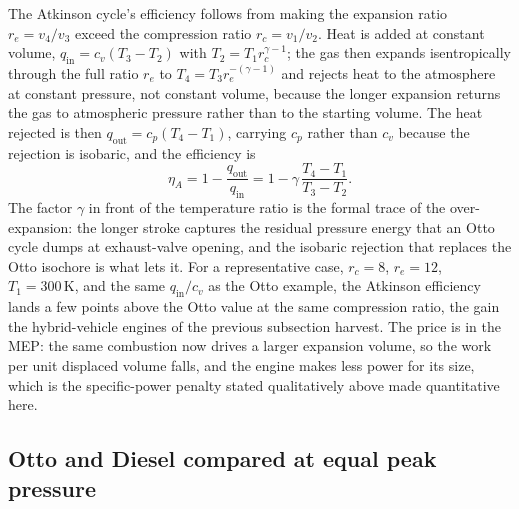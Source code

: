 The Atkinson cycle's efficiency follows from making the expansion ratio
$r_e = v_4/v_3$ exceed the compression ratio $r_c = v_1/v_2$. Heat is added
at constant volume, $q_{\text{in}} = c_v(T_3 - T_2)$ with $T_2 = T_1
r_c^{\gamma-1}$; the gas then expands isentropically through the full ratio
$r_e$ to $T_4 = T_3 r_e^{-(\gamma-1)}$ and rejects heat to the atmosphere at
constant pressure, not constant volume, because the longer expansion returns
the gas to atmospheric pressure rather than to the starting volume. The heat
rejected is then $q_{\text{out}} = c_p(T_4 - T_1)$, carrying $c_p$ rather
than $c_v$ because the rejection is isobaric, and the efficiency is
\[
\eta_A = 1 - \frac{q_{\text{out}}}{q_{\text{in}}}
= 1 - \gamma\,\frac{T_4 - T_1}{T_3 - T_2}.
\]
The factor $\gamma$ in front of the temperature ratio is the formal trace of
the over-expansion: the longer stroke captures the residual pressure energy
that an Otto cycle dumps at exhaust-valve opening, and the isobaric rejection
that replaces the Otto isochore is what lets it. For a representative case,
$r_c = 8$, $r_e = 12$, $T_1 = 300\,\si{\kelvin}$, and the same
$q_{\text{in}}/c_v$ as the Otto example, the Atkinson efficiency lands a few
points above the Otto value at the same compression ratio, the gain the
hybrid-vehicle engines of the previous subsection harvest. The price is in
the MEP: the same combustion now drives a larger expansion volume, so the
work per unit displaced volume falls, and the engine makes less power for its
size, which is the specific-power penalty stated qualitatively above made
quantitative here.

\subsection{Otto and Diesel compared at equal peak pressure}

